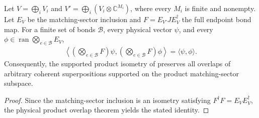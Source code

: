 \begin{lemma}%
    \label{thm:peps_multiplicity_bond_product_overlap}
    \leanok
    Let $V=\bigoplus_i V_i$ and
    $V'=\bigoplus_i(V_i\otimes\mathbb C^{M_i})$, where every $M_i$
    is finite and nonempty. Let $E_V$ be the matching-sector inclusion
    and $F=E_{V'}JE_V^\dagger$ the full endpoint bond map.
    For a finite set of bonds $\mathcal B$, every physical vector
    $\psi$, and every
    $\phi\in\operatorname{ran}\bigotimes_{e\in\mathcal B}E_V$,
    \begin{align}
        \left\langle
        \left(\bigotimes_{e\in\mathcal B}F\right)\psi,
        \left(\bigotimes_{e\in\mathcal B}F\right)\phi
        \right\rangle=\langle\psi,\phi\rangle.
    \end{align}
    Consequently, the supported product isometry of
    \cite[Section~7]{Schuch2010PEPS} preserves all overlaps of arbitrary
    coherent superpositions supported on the product matching-sector subspace.
\end{lemma}
\begin{proof}\leanok
    Since the matching-sector inclusion is an isometry satisfying
    $F^\dagger F=E_VE_V^\dagger$, the physical product overlap
    theorem yields the stated identity.
\end{proof}
